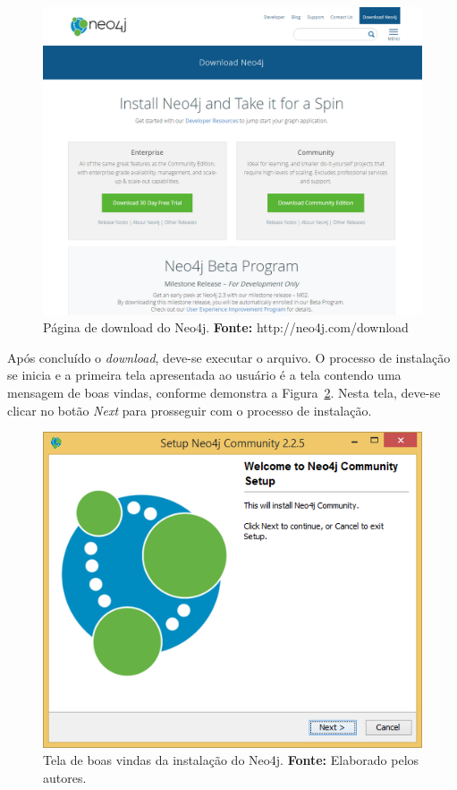 \newpage
\begin{figure}[h!]
	\centerline{\includegraphics[scale=0.4]{./imagens/download-neo4j.png}}
	\caption[Página de download do Neo4j]
	{Página de download do Neo4j. \textbf{Fonte:} http://neo4j.com/download}
	\label{fig:download_neo4j}
\end{figure}

\par Após concluído o \textit{download}, deve-se executar o arquivo. O processo de instalação se inicia e a primeira tela apresentada ao usuário é a tela contendo uma mensagem de boas vindas, conforme demonstra a Figura~\ref{fig:boas_vindas_neo4j}. Nesta tela, deve-se clicar no botão \textit{Next} para prosseguir com o processo de instalação.

\begin{figure}[h!]
	\centerline{\includegraphics[scale=0.4]{./imagens/neo4j-install-step1.png}}
	\caption[Tela de boas vindas da instalação do Neo4j]
	{Tela de boas vindas da instalação do Neo4j. \textbf{Fonte:} Elaborado pelos autores.}
	\label{fig:boas_vindas_neo4j}
\end{figure}

